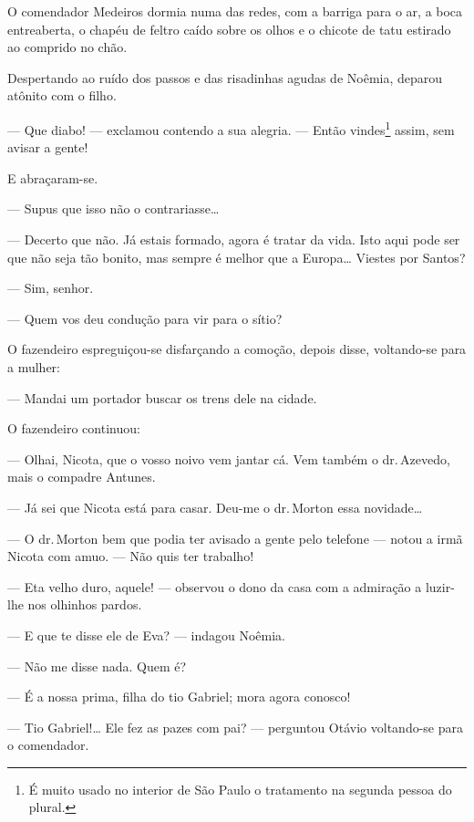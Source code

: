 O comendador Medeiros dormia numa das redes, com a barriga para
o ar, a boca entreaberta, o chapéu de feltro caído sobre os olhos e o
chicote de tatu estirado ao comprido no chão.

Despertando ao ruído dos passos e das risadinhas agudas de
Noêmia, deparou atônito com o filho.

--- Que diabo! --- exclamou contendo a sua alegria. --- Então
vindes\footnote{É muito usado no interior de São Paulo o tratamento na
  segunda pessoa do plural.} assim, sem avisar a gente!

E abraçaram-se.

--- Supus que isso não o contrariasse\ldots{}

--- Decerto que não. Já estais formado, agora é tratar da vida.
Isto aqui pode ser que não seja tão bonito, mas sempre é melhor que a
Europa\ldots{} Viestes por Santos?

--- Sim, senhor.

--- Quem vos deu condução para vir para o sítio?


O fazendeiro espreguiçou-se disfarçando a comoção, depois disse,
voltando-se para a mulher:

--- Mandai um portador buscar os trens dele na cidade.


O fazendeiro continuou:

--- Olhai, Nicota, que o vosso noivo vem jantar cá. Vem também o
dr.\,Azevedo, mais o compadre Antunes.

--- Já sei que Nicota está para casar. Deu-me o dr.\,Morton essa
novidade\ldots{}

--- O dr.\,Morton bem que podia ter avisado a gente pelo telefone ---
notou a irmã Nicota com amuo. --- Não quis ter trabalho!

--- Eta velho duro, aquele! --- observou o dono da casa com a admiração
a luzir-lhe nos olhinhos pardos.

--- E que te disse ele de Eva? --- indagou Noêmia.

--- Não me disse nada. Quem é?

--- É a nossa prima, filha do tio Gabriel; mora agora conosco!

--- Tio Gabriel!\ldots{} Ele fez as pazes com pai? --- perguntou Otávio
voltando-se para o comendador.


